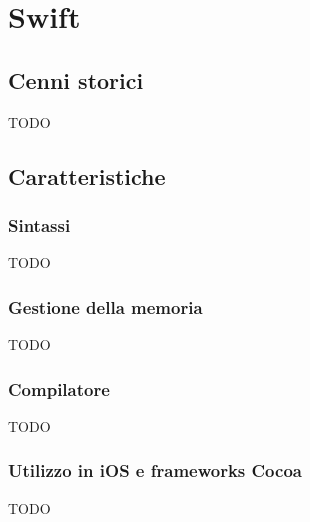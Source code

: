 \chapter{Swift}

\section{Cenni storici}
TODO
\section{Caratteristiche}
\subsection{Sintassi}
TODO
\subsection{Gestione della memoria}
TODO
\subsection{Compilatore}
TODO
\subsection{Utilizzo in iOS e frameworks Cocoa}
TODO